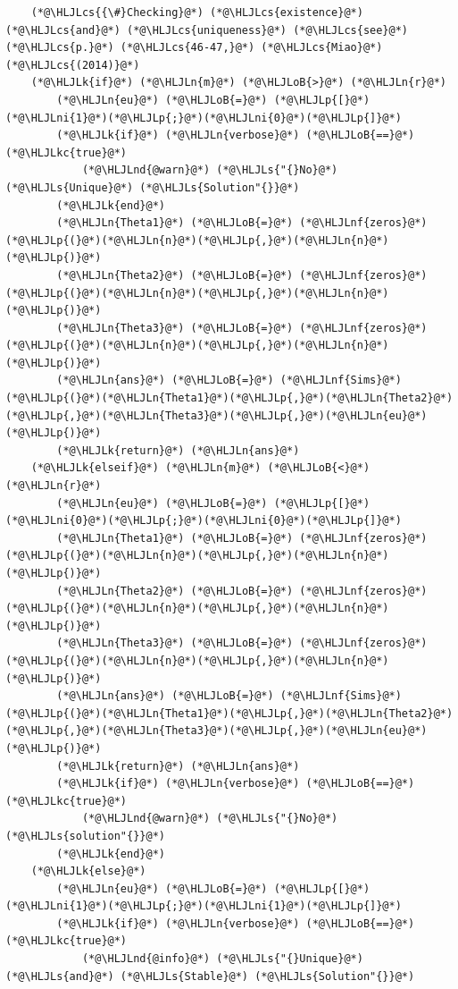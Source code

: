 \documentclass[12pt,a4paper]{article}
\newcommand{\HLJLk}[1]{\textcolor[RGB]{148,91,176}{\textbf{#1}}}
\newcommand{\HLJLkc}[1]{\textcolor[RGB]{59,151,46}{\textit{#1}}}
\newcommand{\HLJLn}[1]{#1}
\newcommand{\HLJLnd}[1]{\textcolor[RGB]{214,102,97}{#1}}
\newcommand{\HLJLnf}[1]{\textcolor[RGB]{66,102,213}{#1}}
\newcommand{\HLJLs}[1]{\textcolor[RGB]{201,61,57}{#1}}
\newcommand{\HLJLni}[1]{\textcolor[RGB]{59,151,46}{#1}}
\newcommand{\HLJLoB}[1]{\textcolor[RGB]{102,102,102}{\textbf{#1}}}
\newcommand{\HLJLp}[1]{#1}
\newcommand{\HLJLcs}[1]{\textcolor[RGB]{153,153,119}{\textit{#1}}}
\begin{document}
\begin{lstlisting}
    (*@\HLJLcs{{\#}Checking}@*) (*@\HLJLcs{existence}@*) (*@\HLJLcs{and}@*) (*@\HLJLcs{uniqueness}@*) (*@\HLJLcs{see}@*) (*@\HLJLcs{p.}@*) (*@\HLJLcs{46-47,}@*) (*@\HLJLcs{Miao}@*) (*@\HLJLcs{(2014)}@*)
    (*@\HLJLk{if}@*) (*@\HLJLn{m}@*) (*@\HLJLoB{>}@*) (*@\HLJLn{r}@*)
        (*@\HLJLn{eu}@*) (*@\HLJLoB{=}@*) (*@\HLJLp{[}@*)(*@\HLJLni{1}@*)(*@\HLJLp{;}@*)(*@\HLJLni{0}@*)(*@\HLJLp{]}@*)
        (*@\HLJLk{if}@*) (*@\HLJLn{verbose}@*) (*@\HLJLoB{==}@*) (*@\HLJLkc{true}@*)
            (*@\HLJLnd{@warn}@*) (*@\HLJLs{"{}No}@*) (*@\HLJLs{Unique}@*) (*@\HLJLs{Solution"{}}@*)
        (*@\HLJLk{end}@*)
        (*@\HLJLn{Theta1}@*) (*@\HLJLoB{=}@*) (*@\HLJLnf{zeros}@*)(*@\HLJLp{(}@*)(*@\HLJLn{n}@*)(*@\HLJLp{,}@*)(*@\HLJLn{n}@*)(*@\HLJLp{)}@*)
        (*@\HLJLn{Theta2}@*) (*@\HLJLoB{=}@*) (*@\HLJLnf{zeros}@*)(*@\HLJLp{(}@*)(*@\HLJLn{n}@*)(*@\HLJLp{,}@*)(*@\HLJLn{n}@*)(*@\HLJLp{)}@*)
        (*@\HLJLn{Theta3}@*) (*@\HLJLoB{=}@*) (*@\HLJLnf{zeros}@*)(*@\HLJLp{(}@*)(*@\HLJLn{n}@*)(*@\HLJLp{,}@*)(*@\HLJLn{n}@*)(*@\HLJLp{)}@*)
        (*@\HLJLn{ans}@*) (*@\HLJLoB{=}@*) (*@\HLJLnf{Sims}@*)(*@\HLJLp{(}@*)(*@\HLJLn{Theta1}@*)(*@\HLJLp{,}@*)(*@\HLJLn{Theta2}@*)(*@\HLJLp{,}@*)(*@\HLJLn{Theta3}@*)(*@\HLJLp{,}@*)(*@\HLJLn{eu}@*)(*@\HLJLp{)}@*)
        (*@\HLJLk{return}@*) (*@\HLJLn{ans}@*)
    (*@\HLJLk{elseif}@*) (*@\HLJLn{m}@*) (*@\HLJLoB{<}@*) (*@\HLJLn{r}@*)
        (*@\HLJLn{eu}@*) (*@\HLJLoB{=}@*) (*@\HLJLp{[}@*)(*@\HLJLni{0}@*)(*@\HLJLp{;}@*)(*@\HLJLni{0}@*)(*@\HLJLp{]}@*)
        (*@\HLJLn{Theta1}@*) (*@\HLJLoB{=}@*) (*@\HLJLnf{zeros}@*)(*@\HLJLp{(}@*)(*@\HLJLn{n}@*)(*@\HLJLp{,}@*)(*@\HLJLn{n}@*)(*@\HLJLp{)}@*)
        (*@\HLJLn{Theta2}@*) (*@\HLJLoB{=}@*) (*@\HLJLnf{zeros}@*)(*@\HLJLp{(}@*)(*@\HLJLn{n}@*)(*@\HLJLp{,}@*)(*@\HLJLn{n}@*)(*@\HLJLp{)}@*)
        (*@\HLJLn{Theta3}@*) (*@\HLJLoB{=}@*) (*@\HLJLnf{zeros}@*)(*@\HLJLp{(}@*)(*@\HLJLn{n}@*)(*@\HLJLp{,}@*)(*@\HLJLn{n}@*)(*@\HLJLp{)}@*)
        (*@\HLJLn{ans}@*) (*@\HLJLoB{=}@*) (*@\HLJLnf{Sims}@*)(*@\HLJLp{(}@*)(*@\HLJLn{Theta1}@*)(*@\HLJLp{,}@*)(*@\HLJLn{Theta2}@*)(*@\HLJLp{,}@*)(*@\HLJLn{Theta3}@*)(*@\HLJLp{,}@*)(*@\HLJLn{eu}@*)(*@\HLJLp{)}@*)
        (*@\HLJLk{return}@*) (*@\HLJLn{ans}@*)
        (*@\HLJLk{if}@*) (*@\HLJLn{verbose}@*) (*@\HLJLoB{==}@*) (*@\HLJLkc{true}@*)
            (*@\HLJLnd{@warn}@*) (*@\HLJLs{"{}No}@*) (*@\HLJLs{solution"{}}@*)
        (*@\HLJLk{end}@*)
    (*@\HLJLk{else}@*)
        (*@\HLJLn{eu}@*) (*@\HLJLoB{=}@*) (*@\HLJLp{[}@*)(*@\HLJLni{1}@*)(*@\HLJLp{;}@*)(*@\HLJLni{1}@*)(*@\HLJLp{]}@*)
        (*@\HLJLk{if}@*) (*@\HLJLn{verbose}@*) (*@\HLJLoB{==}@*) (*@\HLJLkc{true}@*)
            (*@\HLJLnd{@info}@*) (*@\HLJLs{"{}Unique}@*) (*@\HLJLs{and}@*) (*@\HLJLs{Stable}@*) (*@\HLJLs{Solution"{}}@*)

\end{lstlisting}
\end{document}
